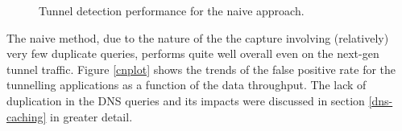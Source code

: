 \documentclass{llncs}
\begin{document}
%

\begin{figure}
\centering
{}
\caption{Tunnel detection performance for the naive approach.}
\end{figure}

%
The naive method, due to the nature of the the capture involving (relatively)
very few duplicate queries, performs quite well overall even on the next-gen
tunnel traffic. Figure \ref{cnplot} shows the trends of the false positive rate
for the tunnelling applications as a function of the data throughput. The lack
of duplication in the DNS queries and its impacts were discussed in section
\ref{dns-caching} in greater detail.
\end{document}
